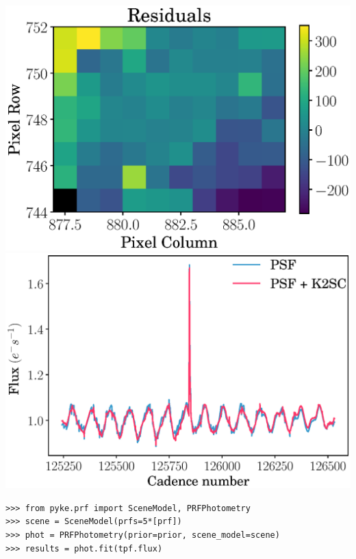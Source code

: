 \documentclass[landscape,a0b,final]{a0poster}
\newenvironment{poster}{
  \begin{center}
  \begin{minipage}[c]{0.98\textwidth}
}{
  \end{minipage}
  \end{center}
}
\newenvironment{pcolumn}[1]{
  \begin{minipage}{#1\textwidth}
  \begin{center}
}{
  \end{center}
  \end{minipage}
}
\newcommand{\pbox}[4]{
\psshadowbox[#3]{
\begin{minipage}[t][#2][t]{#1}
#4
\end{minipage}
}}
\begin{document}
\begin{poster}
\begin{center}
\begin{pcolumn}{0.32}
{    \includegraphics[width=16cm,angle=0]{figs/residuals_c9.eps}
    \includegraphics[width=17cm,angle=0]{figs/lc_c9.eps}

    \texttt{>>> from pyke.prf import SceneModel, PRFPhotometry}\\
    \texttt{>>> scene = SceneModel(prfs=5*[prf])} \\
    \texttt{>>> phot = PRFPhotometry(prior=prior, scene\_model=scene)} \\
    \texttt{>>> results = phot.fit(tpf.flux)} \\
}


\end{pcolumn}
\begin{pcolumn}{0.32}
\pbox{0.90\textwidth}{65cm}{linewidth=2mm,framearc=0.1,linecolor=lightblue,fillstyle=gradient,gradangle=0,gradbegin=white,gradend=white,gradmidpoint=1.0,framesep=1em}{

}
\end{pcolumn}
\end{center}
\end{poster}
\end{document}

